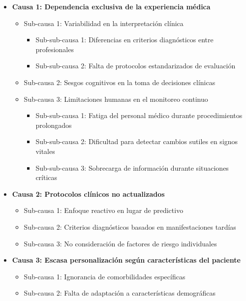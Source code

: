 \documentclass[12pt, letterpaper]{article}
\begin{document}
\begin{itemize}
    \item \textbf{Causa 1: Dependencia exclusiva de la experiencia médica}
    \begin{itemize}
        \item Sub-causa 1: Variabilidad en la interpretación clínica
        \begin{itemize}
            \item Sub-sub-causa 1: Diferencias en criterios diagnósticos entre profesionales
            \item Sub-sub-causa 2: Falta de protocolos estandarizados de evaluación
        \end{itemize}
        \item Sub-causa 2: Sesgos cognitivos en la toma de decisiones clínicas
        \item Sub-causa 3: Limitaciones humanas en el monitoreo continuo
        \begin{itemize}
            \item Sub-sub-causa 1: Fatiga del personal médico durante procedimientos prolongados
            \item Sub-sub-causa 2: Dificultad para detectar cambios sutiles en signos vitales
            \item Sub-sub-causa 3: Sobrecarga de información durante situaciones críticas
        \end{itemize}
    \end{itemize}
    
    \item \textbf{Causa 2: Protocolos clínicos no actualizados}
    \begin{itemize}
        \item Sub-causa 1: Enfoque reactivo en lugar de predictivo
        \item Sub-causa 2: Criterios diagnósticos basados en manifestaciones tardías
        \item Sub-causa 3: No consideración de factores de riesgo individuales
    \end{itemize}
    
    \item \textbf{Causa 3: Escasa personalización según características del paciente}
    \begin{itemize}
        \item Sub-causa 1: Ignorancia de comorbilidades específicas
        \item Sub-causa 2: Falta de adaptación a características demográficas
    \end{itemize}
\end{itemize}
\end{document}
